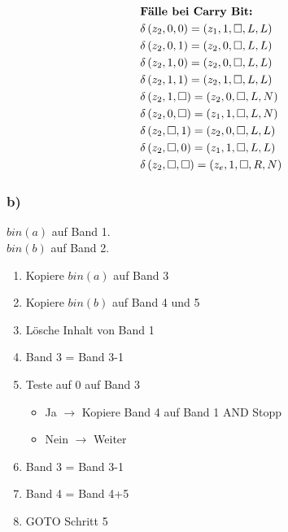 \documentclass[a4paper,12pt]{article}
\begin{document}
	\begin{align*}
		&\text{\textbf{Fälle bei Carry Bit:}}\\
		& \delta \left( z_2,0,0\right) = \left( z_1, 1, \square, L, L\right)\\
		& \delta \left( z_2,0,1\right) = \left( z_2, 0,  \square, L, L\right)\\
		& \delta \left( z_2,1,0\right) = \left( z_2, 0, \square, L, L\right)\\
		& \delta \left( z_2,1,1\right) = \left( z_2, 1, \square, L, L\right)\\
		& \delta \left( z_2,1,\square\right) = \left( z_2, 0, \square, L, N\right)\\
		& \delta \left( z_2,0,\square\right) = \left( z_1, 1, \square, L, N\right)\\
		& \delta \left( z_2,\square, 1\right) = \left( z_2, 0, \square, L, L\right)\\
		& \delta \left( z_2,\square, 0\right) = \left( z_1, 1, \square, L, L\right)\\
		& \delta \left( z_2,\square,\square\right) = \left( z_e, 1, \square, R, N\right)
	\end{align*}
	\newpage
	\subsubsection*{b)}
	 $bin\left( a\right)$ auf Band 1.\\
	 $bin\left( b\right)$ auf Band 2.
	\begin{enumerate}
		\item Kopiere $bin\left( a\right)$ auf Band 3
		\item Kopiere $bin\left( b\right)$ auf Band 4 und 5
		\item Lösche Inhalt von Band 1
		\item Band 3 = Band 3-1
		\item Teste auf 0 auf Band 3
		\begin{itemize}
			\item[] Ja $\rightarrow$ Kopiere Band 4 auf Band 1 AND Stopp
			\item[] Nein $\rightarrow$ Weiter
		\end{itemize}
		\item Band 3 = Band 3-1
		\item Band 4 = Band 4+5
		\item GOTO Schritt 5
	\end{enumerate}
	
\end{document}
